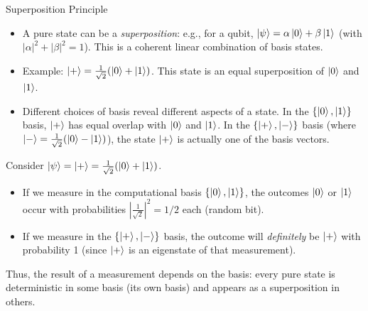 \begin{frame}{Superposition Principle}
  \begin{itemize}
    \item A pure state can be a \textit{superposition}: e.g., for a qubit, $\ket{\psi} = \alpha\ket{0} + \beta\ket{1}$ (with $|\alpha|^2+|\beta|^2=1$). This is a coherent linear combination of basis states.
    \item Example: $\ket{+} = \frac{1}{\sqrt{2}}(\ket{0} + \ket{1})$. This state is an equal superposition of $\ket{0}$ and $\ket{1}$.
    \item Different choices of basis reveal different aspects of a state. In the $\{\ket{0},\ket{1}\}$ basis, $\ket{+}$ has equal overlap with $\ket{0}$ and $\ket{1}$. In the $\{\ket{+},\ket{-}\}$ basis (where $\ket{-}=\frac{1}{\sqrt{2}}(\ket{0}-\ket{1})$), the state $\ket{+}$ is actually one of the basis vectors.
  \end{itemize}

  \begin{example}
    Consider $\ket{\psi} = \ket{+} = \frac{1}{\sqrt{2}}(\ket{0}+\ket{1})$. 
    \begin{itemize}
      \item If we measure in the computational basis $\{\ket{0},\ket{1}\}$, the outcomes $\ket{0}$ or $\ket{1}$ occur with probabilities $|\frac{1}{\sqrt{2}}|^2 = 1/2$ each (random bit).
      \item If we measure in the $\{\ket{+},\ket{-}\}$ basis, the outcome will \emph{definitely} be $\ket{+}$ with probability 1 (since $\ket{+}$ is an eigenstate of that measurement).
    \end{itemize}
    Thus, the result of a measurement depends on the basis: every pure state is deterministic in some basis (its own basis) and appears as a superposition in others.
  \end{example}
\end{frame}

